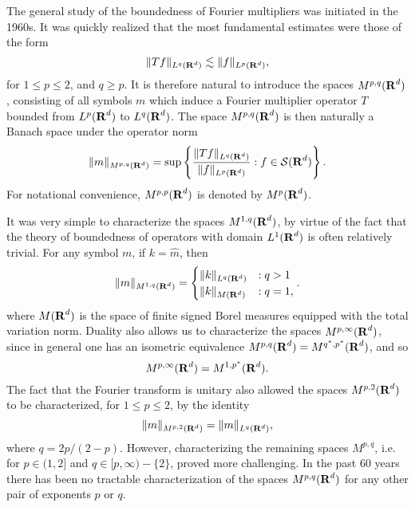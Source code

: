 The general study of the boundedness of Fourier multipliers was initiated in the 1960s. It was quickly realized that the most fundamental estimates were those of the form
%
\[ \| Tf \|_{L^q(\operatorname{\mathbf{R}}^d)} \lesssim \| f \|_{L^p(\operatorname{\mathbf{R}}^d)}, \]
%
for $1 \leq p \leq 2$, and $q \geq p$. It is therefore natural to introduce the spaces $M^{p,q}(\operatorname{\mathbf{R}}^d)$, consisting of all symbols $m$ which induce a Fourier multiplier operator $T$ bounded from $L^p(\operatorname{\mathbf{R}}^d)$ to $L^q(\operatorname{\mathbf{R}}^d)$. The space $M^{p,q}(\operatorname{\mathbf{R}}^d)$ is then naturally a Banach space under the operator norm
%
\[ \| m \|_{M^{p,q}(\operatorname{\mathbf{R}}^d)} = \sup \left\{ \frac{\| T f \|_{L^q(\operatorname{\mathbf{R}}^d)}}{\| f \|_{L^p(\operatorname{\mathbf{R}}^d)}} : f \in \mathcal{S}(\operatorname{\mathbf{R}}^d) \right\}. \]
%
For notational convenience, $M^{p,p}(\operatorname{\mathbf{R}}^d)$ is denoted by $M^p(\operatorname{\mathbf{R}}^d)$.

It was very simple to characterize the spaces $M^{1,q}(\operatorname{\mathbf{R}}^d)$, by virtue of the fact that the theory of boundedness of operators with domain $L^1(\operatorname{\mathbf{R}}^d)$ is often relatively trivial. For any symbol $m$, if $k = \widehat{m}$, then
%
\[ \| m \|_{M^{1,q}(\operatorname{\mathbf{R}}^d)} = \begin{cases} \| k \|_{L^q(\operatorname{\mathbf{R}}^d)} &: q > 1 \\ \| k \|_{M(\operatorname{\mathbf{R}}^d)} &: q = 1, \end{cases}. \]
%
where $M(\operatorname{\mathbf{R}}^d)$ is the space of finite signed Borel measures equipped with the total variation norm. Duality also allows us to characterize the spaces $M^{p,\infty}(\operatorname{\mathbf{R}}^d)$, since in general one has an isometric equivalence $M^{p,q}(\operatorname{\mathbf{R}}^d) = M^{q^*,p^*}(\operatorname{\mathbf{R}}^d)$, and so
%
\[ M^{p,\infty}(\operatorname{\mathbf{R}}^d) = M^{1,p^*}(\operatorname{\mathbf{R}}^d). \]
%
The fact that the Fourier transform is unitary also allowed the spaces $M^{p,2}(\operatorname{\mathbf{R}}^d)$ to be characterized, for $1 \leq p \leq 2$, by the identity
%
\[ \| m \|_{M^{p,2}(\operatorname{\mathbf{R}}^d)} = \| m \|_{L^q(\operatorname{\mathbf{R}}^d)}, \]
%
where $q = 2p/(2-p)$. However, characterizing the remaining spaces $M^{p,q}$, i.e. for $p \in (1,2]$ and $q \in [p, \infty) - \{ 2 \}$, proved more challenging. In the past 60 years there has been no tractable characterization of the spaces $M^{p,q}(\operatorname{\mathbf{R}}^d)$ for any other pair of exponents $p$ or $q$.

